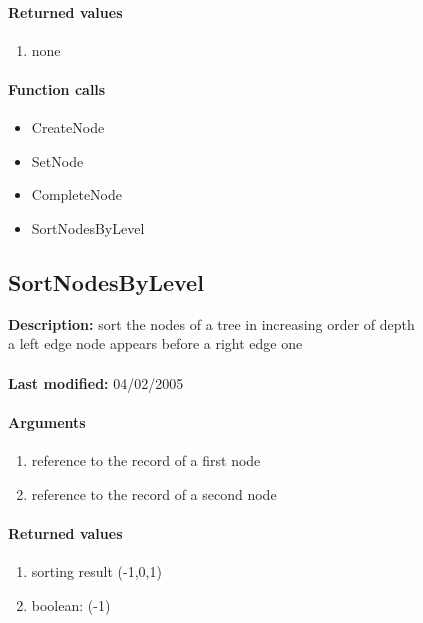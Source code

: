 \paragraph{Returned values}
\begin{enumerate}
\item none
\end{enumerate}

\paragraph{Function calls}
\begin{itemize}
\item CreateNode
\item SetNode
\item CompleteNode
\item SortNodesByLevel
\end{itemize}

\subsection{SortNodesByLevel}
\textbf{Description:} sort the nodes of a tree in increasing order of depth\\
a left edge node appears before a right edge one\\
\\\textbf{Last modified:} 04/02/2005

\paragraph{Arguments}
\begin{enumerate}
\item reference to the record of a first node
\item reference to the record of a second node
\end{enumerate}

\paragraph{Returned values}
\begin{enumerate}
\item sorting result (-1,0,1)
\item boolean: (-1)
\end{enumerate}

